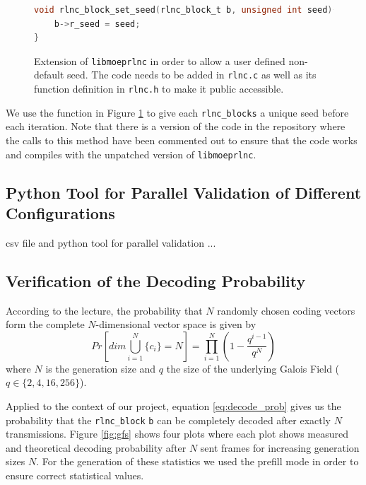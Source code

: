 \documentclass[a4paper,english,10pt]{tumarticle}
\begin{document}
\begin{figure}[h]
  \begin{lstlisting}[language=C]
void rlnc_block_set_seed(rlnc_block_t b, unsigned int seed){
    b->r_seed = seed;
}
\end{lstlisting}
  \caption[]{Extension of \texttt{libmoeprlnc} in order to allow a user defined non-default seed. The code needs to be added in \texttt{rlnc.c} as well as 
  its function definition in \texttt{rlnc.h} to make it public accessible.}
  \label{code}
\end{figure}

We use the function in Figure \ref{code} to give each \texttt{rlnc\_blocks} a unique seed before each iteration.
Note that there is a version of the code in the repository where the calls to this method 
have been commented out to ensure that the code works and compiles with the unpatched version of \texttt{libmoeprlnc}.



\subsection{Python Tool for Parallel Validation of Different Configurations}
csv file and python tool for parallel validation
...

\subsection{Verification of the Decoding Probability}
According to the lecture, the probability that $N$ randomly chosen coding vectors form
the complete $N$-dimensional vector space is given by %
\begin{equation} 
  Pr[dim\bigcup_{i=1}^{N}\{c_i\} = N] = \prod_{i=1}^{N} (1 - \frac{q^{i - 1}}{q ^ {N}})
  \label{eq:decode_prob}
\end{equation}
where $N$ is the generation size and $q$ the size of the underlying Galois Field ($q \in \{2,4,16,256\}$).

Applied to the context of our project, equation \eqref{eq:decode_prob} gives us
the probability that the \texttt{rlnc\_block} \texttt{b} can be completely
decoded after exactly $N$ transmissions. Figure \ref{fig:gfs} shows four plots
where each plot shows measured and theoretical decoding probability after $N$
sent frames for increasing generation sizes $N$. For the generation of these
statistics we used the prefill mode in order to ensure correct statistical values.
\end{document}
